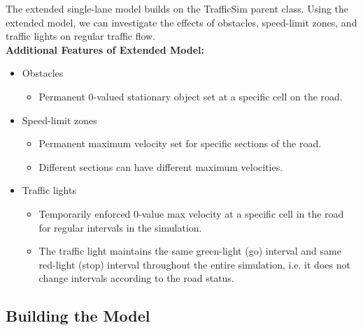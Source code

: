 \documentclass[11pt]{article}
\providecommand{\tightlist}{%
      \setlength{\itemsep}{0pt}\setlength{\parskip}{0pt}}
\begin{document}
The extended single-lane model builds on the TrafficSim parent class.
Using the extended model, we can investigate the effects of obstacles,
speed-limit zones, and traffic lights on regular traffic flow.\\

\textbf{Additional Features of Extended Model:}

\begin{itemize}
\tightlist
\item
  Obstacles

  \begin{itemize}
  \tightlist
  \item
    Permanent 0-valued stationary object set at a specific cell on the
    road.
  \end{itemize}
\item
  Speed-limit zones

  \begin{itemize}
  \tightlist
  \item
    Permanent maximum velocity set for specific sections of the road.
  \item
    Different sections can have different maximum velocities.
  \end{itemize}
\item
  Traffic lights

  \begin{itemize}
  \tightlist
  \item
    Temporarily enforced 0-value max velocity at a specific cell in the
    road for regular intervals in the simulation.
  \item
    The traffic light maintains the same green-light (go) interval and
    same red-light (stop) interval throughout the entire simulation,
    i.e. it does not change intervals according to the road status.
  \end{itemize}
\end{itemize}

    \subsection{Building the Model}
\end{document}
